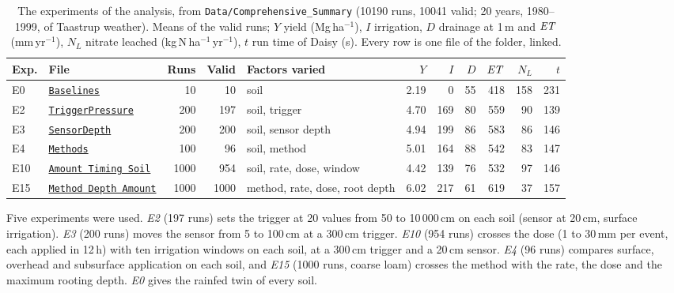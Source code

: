 \documentclass[review,12pt,authoryear]{elsarticle}
\begin{document}
\begin{table}[!htbp]\centering\scriptsize
\caption{The experiments of the analysis, from \texttt{Data/Comprehensive\_Summary} (10190 runs, 10041 valid; 20 years, 1980--1999, of Taastrup weather). Means of the valid runs; $Y$ yield (Mg\,ha$^{-1}$), $I$ irrigation, $D$ drainage at 1\,m and $\mathit{ET}$ (mm\,yr$^{-1}$), $N_L$ nitrate leached (kg\,N\,ha$^{-1}$\,yr$^{-1}$), $t$ run time of Daisy (s). Every row is one file of the folder, linked.}
\label{tab:data4}
\setlength{\tabcolsep}{3pt}
\begin{tabular}{@{}llrrp{3.5cm}rrrrrr@{}}
\toprule
Exp. & File & Runs & Valid & Factors varied & $Y$ & $I$ & $D$ & $\mathit{ET}$ & $N_L$ & $t$\\\midrule
E0 & \href{\repourl/blob/main/Data/Comprehensive_Summary/E00_Baselines.csv.gz}{\texttt{Baselines}} & 10 & 10 & soil & 2.19 & 0 & 55 & 418 & 158 & 231\\
E2 & \href{\repourl/blob/main/Data/Comprehensive_Summary/E02_TriggerPressure.csv.gz}{\texttt{TriggerPressure}} & 200 & 197 & soil, trigger & 4.70 & 169 & 80 & 559 & 90 & 139\\
E3 & \href{\repourl/blob/main/Data/Comprehensive_Summary/E03_SensorDepth.csv.gz}{\texttt{SensorDepth}} & 200 & 200 & soil, sensor depth & 4.94 & 199 & 86 & 583 & 86 & 146\\
E4 & \href{\repourl/blob/main/Data/Comprehensive_Summary/E04_Methods.csv.gz}{\texttt{Methods}} & 100 & 96 & soil, method & 5.01 & 164 & 88 & 542 & 83 & 147\\
E10 & \href{\repourl/blob/main/Data/Comprehensive_Summary/E10_Amount_Timing_Soil.csv.gz}{\texttt{Amount Timing Soil}} & 1000 & 954 & soil, rate, dose, window & 4.42 & 139 & 76 & 532 & 97 & 146\\
E15 & \href{\repourl/blob/main/Data/Comprehensive_Summary/E15_Method_Depth_Amount.csv.gz}{\texttt{Method Depth Amount}} & 1000 & 1000 & method, rate, dose, root depth & 6.02 & 217 & 61 & 619 & 37 & 157\\
\bottomrule
\end{tabular}
\end{table}

Five experiments were used. \emph{E2} (197 runs) sets the trigger at 20 values from 50 to 10\,000\,cm on each soil (sensor at 20\,cm, surface irrigation). \emph{E3} (200 runs) moves the sensor from 5 to 100\,cm at a 300\,cm trigger. \emph{E10} (954 runs) crosses the dose (1 to 30\,mm per event, each applied in 12\,h) with ten irrigation windows on each soil, at a 300\,cm trigger and a 20\,cm sensor. \emph{E4} (96 runs) compares surface, overhead and subsurface application on each soil, and \emph{E15} (1000 runs, coarse loam) crosses the method with the rate, the dose and the maximum rooting depth. \emph{E0} gives the rainfed twin of every soil.
\end{document}
